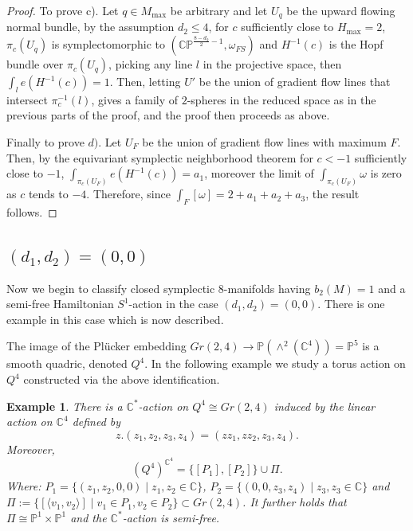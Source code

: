 \documentclass[12pt]{article}
\newtheorem{example}[theorem]{Example}
\begin{document}
\begin{proof}
To prove c). Let $q \in M_{\max}$ be arbitrary and let $U_{q}$ be the upward flowing normal bundle, by the assumption $d_2 \leq 4$, for $c$ sufficiently close to $H_{\max} =2$, $\pi_{c}(U_q)$ is symplectomorphic to $(\mathbb{CP}^{\frac{8-d_2}{2} -1},\omega_{FS})$ and $H^{-1}(c)$ is the Hopf bundle over $\pi_{c}(U_q)$, picking any line $l$ in the projective space, then $\int_{l} e(H^{-1}(c)) = 1$. Then, letting $U'$ be the union of gradient flow lines that intersect $\pi_{c}^{-1}(l)$, gives a family of $2$-spheres in the reduced space as in the previous parts of the proof, and the proof then proceeds as above. 

Finally to prove $d).$  Let $U_{F}$ be the union of gradient flow lines with maximum $F$. Then, by the equivariant symplectic neighborhood theorem for $c<-1$ sufficiently close to $-1$, $\int_{\pi_{c}(U_{F})} e(H^{-1}(c)) = a_{1}$, moreover the limit of $\int_{\pi_{c}(U_{F})} \omega$ is zero as $c$ tends to $-4$. Therefore, since $\int_{F} [\omega] = 2 + a_1 + a_2 + a_3$, the result follows. \end{proof}


\subsection{ $(d_1,d_2) = (0,0)$}
Now we begin to classify closed symplectic $8$-manifolds having $b_{2}(M)=1$ and a semi-free Hamiltonian $S^1$-action in the case $(d_1,d_2)=(0,0)$. There is one example in this case which is now described.

The image of the Pl\"{u}cker embedding $Gr(2,4) \rightarrow \mathbb{P}(\wedge^2(\mathbb{C}^4)) =  \mathbb{P}^5$ is a smooth quadric, denoted $Q^4$. In the following example we study a torus action on $Q^4$ constructed via the above identification.
 
\begin{example} \label{quadricone}
There is a $\mathbb{C}^*$-action on $Q^4 \cong Gr(2,4)$ induced by the linear action on $\mathbb{C}^4$ defined by $$z.(z_1,z_2,z_3,z_4) = (zz_1,zz_2,z_3,z_4).$$ Moreover, $$(Q^4)^{\mathbb{C}^4} = \{[P_1],[P_{2}]\} \cup \Pi.$$ Where: $P_1=\{(z_1,z_2,0,0) \mid z_1,z_2 \in \mathbb{C}\}$, $P_2=\{(0,0,z_3,z_4) \mid z_3,z_3 \in \mathbb{C}\}$ and $\Pi := \{[\langle v_1,v_2 \rangle] \mid v_1 \in P_1,  v_{2} \in P_{2}\} \subset Gr(2,4)$.  It further holds that $\Pi  \cong \mathbb{P}^1 \times \mathbb{P}^1$ and the $\mathbb{C}^*$-action is semi-free. 
 \end{example}
\end{document}
